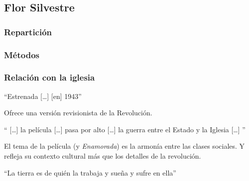 \subsection{Flor Silvestre}
\subsubsection{Repartición}
\subsubsection{Métodos}
\subsubsection{Relación con la iglesia}
    \begin{compactitem}
    \item ``Estrenada [\ldots] [en] 1943''\autocite[17]{garcia_riera_historia_1992}
    \item Ofrece una versión revisionista de la Revolución.\autocite[369]{sanchez_vi._2010}
    \item `` [\ldots] la película [\ldots] pasa por alto [\ldots] la guerra entre el Estado y la Iglesia [\ldots] ''\autocite[370]{sanchez_vi._2010}
    \item El tema de la película (y \emph{Enamorada}) es la armonía entre las clases sociales. Y refleja su contexto cultural más que los detalles de la revolución.\autocite[365]{sanchez_vi._2010}
    \item ``La tierra es de quién la trabaja y sueña y sufre en ella''\autocite[11:14]{fernandez_flor_1943}

\end{compactitem}
